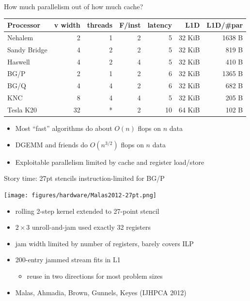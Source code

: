 \documentclass{beamer}
\begin{document}
\begin{frame}{How much parallelism out of how much cache?}
  \begin{tabular}{l rrrr rr}
    \toprule
    Processor & v width & threads & F/inst & latency & L1D & L1D/\#par \\
    \midrule
    Nehalem & 2 & 1 & 2 & 5 & 32 KiB & 1638 B \\
    Sandy Bridge & 4 & 2 & 2 & 5 & 32 KiB & 819 B \\
    Haswell & 4 & 2 & 4 & 5 & 32 KiB & 410 B \\
    BG/P & 2 & 1 & 2 & 6 & 32 KiB & 1365 B \\
    BG/Q & 4 & 4 & 2 & 6 & 32 KiB & 682 B \\
    KNC & 8 & 4 & 4 & 5 & 32 KiB & 205 B \\
    Tesla K20 & 32 & * & 2 & 10 & 64 KiB & 102 B \\
    \bottomrule
  \end{tabular}
  \begin{itemize}
  \item Most ``fast'' algorithms do about $O(n)$ flops on $n$ data
  \item DGEMM and friends do $O(n^{3/2})$ flops on $n$ data
  \item Exploitable parallelism limited by cache and register load/store
  \end{itemize}
\end{frame}

\begin{frame}{Story time: 27pt stencils instruction-limited for BG/P}
  \begin{center}
    \texttt{[image: figures/hardware/Malas2012-27pt.png]}
  \end{center}
  \begin{itemize}
  \item rolling 2-step kernel extended to 27-point stencil
  \item $2\times 3$ unroll-and-jam used exactly 32 registers
  \item jam width limited by number of registers, barely covers ILP
  \item 200-entry jammed stream fits in L1
    \begin{itemize}
    \item reuse in two directions for most problem sizes
    \end{itemize}
  \item Malas, Ahmadia, Brown, Gunnels, Keyes (IJHPCA 2012)
  \end{itemize}
\end{frame}
\end{document}
